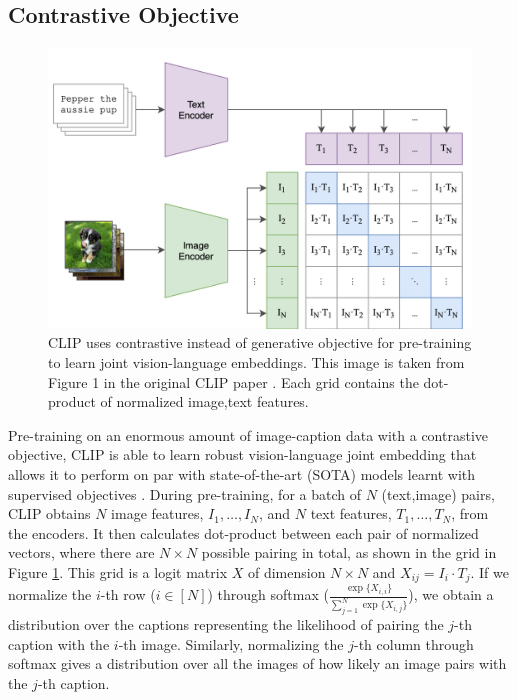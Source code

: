 \subsection{Contrastive Objective} \label{clip.objective}

\begin{figure}[!htb]
\includegraphics[width=0.7\linewidth]{modeling/CLIP.png}  
\caption{CLIP uses contrastive instead of generative objective for pre-training to learn joint vision-language embeddings. This image is taken from Figure 1 in the original CLIP paper \citep{CLIPpaper}. Each grid contains the dot-product of normalized image,text features.}
\label{modeling.clip.pretrainingobj}
\end{figure}

Pre-training on an enormous amount of image-caption data with a contrastive objective, CLIP is able to learn robust vision-language joint embedding that allows it to perform on par with state-of-the-art (SOTA) models learnt with supervised objectives \citep{CLIPpaper}.  
During pre-training, for a batch of $N$ (text,image) pairs, CLIP obtains $N$ image features, $I_1,\dots,I_N$, and $N$ text features, $T_1,\dots,T_N$, from the encoders. 
It then calculates dot-product between each pair of normalized vectors, where there are $N \times N$ possible pairing in total, as shown in the grid in Figure \ref{modeling.clip.pretrainingobj}.
This grid is a logit matrix $X$ of dimension $N\times N$ and $X_{ij} = I_i \cdot T_j$. 
If we normalize the $i$-th row ($i \in [N]$) through softmax ($\frac{\exp\{ {X}_{i,i} \}}{ \sum_{j=1}^N \exp\{ {X}_{i,j}\}}$), we obtain a distribution over the captions representing the likelihood of pairing the $j$-th caption with the $i$-th image. 
Similarly, normalizing the $j$-th column through softmax gives a distribution over all the images of how likely an image pairs with the $j$-th caption. 

